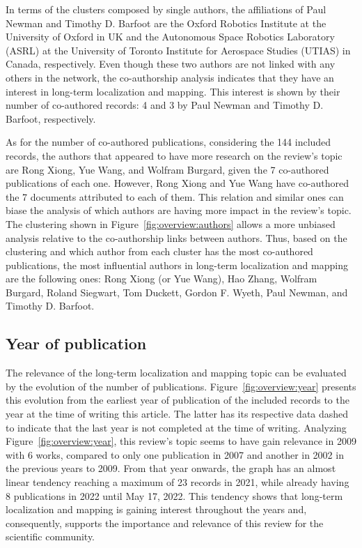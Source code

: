 In terms of the clusters composed by single authors, the affiliations of Paul Newman and Timothy D. Barfoot are the Oxford Robotics Institute at the University of Oxford in UK and the Autonomous Space Robotics Laboratory (ASRL) at the University of Toronto Institute for Aerospace Studies (UTIAS) in Canada, respectively. Even though these two authors are not linked with any others in the network, the co-authorship analysis indicates that they have an interest in long-term localization and mapping. This interest is shown by their number of co-authored records: 4 and 3 by Paul Newman and Timothy D. Barfoot, respectively.

As for the number of co-authored publications, considering the 144 included records, the authors that appeared to have more research on the review's topic are Rong Xiong, Yue Wang, and Wolfram Burgard, given the 7 co-authored publications of each one. However, Rong Xiong and Yue Wang have co-authored the 7 documents attributed to each of them. This relation and similar ones can biase the analysis of which authors are having more impact in the review's topic.
The clustering shown in Figure~\ref{fig:overview:authors} allows a more unbiased analysis relative to the co-authorship links between authors. Thus, based on the clustering and which author from each cluster has the most co-authored publications, the most influential authors in long-term localization and mapping are the following ones: Rong Xiong (or Yue Wang), Hao Zhang, Wolfram Burgard, Roland Siegwart, Tom Duckett, Gordon F. Wyeth, Paul Newman, and Timothy D. Barfoot.

\subsection{Year of publication}
\label{sec:overview:year}

The relevance of the long-term localization and mapping topic can be evaluated by the evolution of the number of publications. Figure~\ref{fig:overview:year} presents this evolution from the earliest year of publication of the included records to the year at the time of writing this article. The latter has its respective data dashed to indicate that the last year is not completed at the time of writing. Analyzing Figure~\ref{fig:overview:year}, this review's topic seems to have gain relevance in 2009 with 6 works, compared to only one publication in 2007 and another in 2002 in the previous years to 2009. From that year onwards, the graph has an almost linear tendency reaching a maximum of 23 records in 2021, while already having 8 publications in 2022 until May 17, 2022. This tendency shows that long-term localization and mapping is gaining interest throughout the years and, consequently, supports the importance and relevance of this review for the scientific community.

